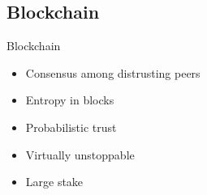\subsection{Blockchain}

\begin{frame}{Blockchain}
    \begin{itemize}
        \item Consensus among distrusting peers
        \item Entropy in blocks
        \item Probabilistic trust
        \item Virtually unstoppable
        \item Large stake
    \end{itemize}
\end{frame}
\note{
}
